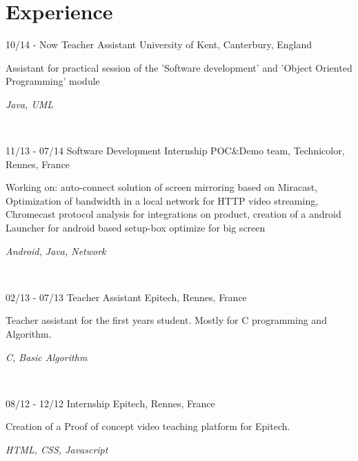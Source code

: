 \documentclass[]{friggeri-cv}
\begin{document}
\section{Experience}
\begin{entrylist}
  \entry
    {10/14 - Now}
    {Teacher Assistant}
    {University of Kent, Canterbury, England}
    {Assistant for practical session of the 'Software development' and 'Object Oriented Programming' module
    \begin{FlushRight}\textit{Java, UML}\end{FlushRight}~}
  \entry
    {11/13 - 07/14}
    {Software Development Internship}
    {POC\&Demo team, Technicolor, Rennes, France}
    {Working on: auto-connect solution of screen mirroring based on Miracast, Optimization of bandwidth in a local network for HTTP video streaming, Chromecast protocol analysis for integrations on product, creation of a android Launcher for android based setup-box optimize for big screen \begin{FlushRight}\textit{Android, Java, Network}\end{FlushRight} ~}
    \entry
    {02/13 - 07/13}
    {Teacher Assistant}
    {Epitech, Rennes, France}
    {Teacher assistant for the first years student. Mostly for C programming and Algorithm.
    \begin{FlushRight}\textit{C, Basic Algorithm}\end{FlushRight} ~}
    \entry
    {08/12 - 12/12}
    {Internship}
    {Epitech, Rennes, France}
    {Creation of a Proof of concept video teaching platform for Epitech.
    \begin{FlushRight}\textit{HTML, CSS, Javascript}\end{FlushRight}}

\end{entrylist}
\end{document}
